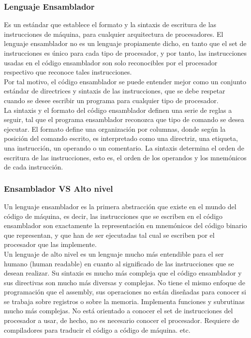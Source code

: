 \documentclass[twocolumn]{IEEEtran}
\begin{document}
\subsubsection{Lenguaje Ensamblador}
\noindent
Es un estándar que establece el formato y la sintaxis de escritura de las instrucciones de máquina, para cualquier arquitectura de procesadores. El lenguaje ensamblador no es un lenguaje propiamente dicho, en tanto que el set de instrucciones es único para cada tipo de procesador, y por tanto, las instrucciones usadas en el código ensamblador son solo reconocibles por el procesador respectivo que reconoce tales instrucciones.\\
Por tal motivo, el código ensamblador se puede entender mejor como un conjunto estándar de directrices y sintaxis de las instrucciones, que se debe respetar cuando se desee escribir un programa para cualquier tipo de procesador.\\
La sintaxis y el formato del código ensamblador definen una serie de reglas a seguir, tal que el programa ensamblador reconozca que tipo de comando se desea ejecutar. El formato define una organización por columnas, donde según la posición del comando escrito, es interpretado como una directriz, una etiqueta, una instrucción, un operando o un comentario. La sintaxis determina el orden de escritura de las instrucciones, esto es, el orden de los operandos y los mnemónicos de cada instrucción.

\subsubsection{Ensamblador VS Alto nivel}
\noindent
Un lenguaje ensamblador es la primera abstracción que existe en el mundo del código de máquina, es decir, las instrucciones que se escriben en el código ensamblador son exactamente la representación en mnemónicos del código binario que representan, y que han de ser ejecutadas tal cual se escriben por el procesador que las implemente.\\
Un lenguaje de alto nivel es un lenguaje mucho más entendible para el ser humano (human readable) en cuanto al significado de las instrucciones que se desean realizar. Su sintaxis es mucho más compleja que el código ensamblador y sus directivas son mucho más diversas y complejas. No tiene el mismo enfoque de programación que el assembly, sus operaciones no están diseñadas para conocer si se trabaja sobre registros o sobre la memoria. Implementa funciones y subrutinas mucho más complejas. No está orientado a conocer el set de instrucciones del procesador a usar, de hecho, no es necesario conocer el procesador. Requiere de compiladores para traducir el código a código de máquina. etc.
\end{document}
